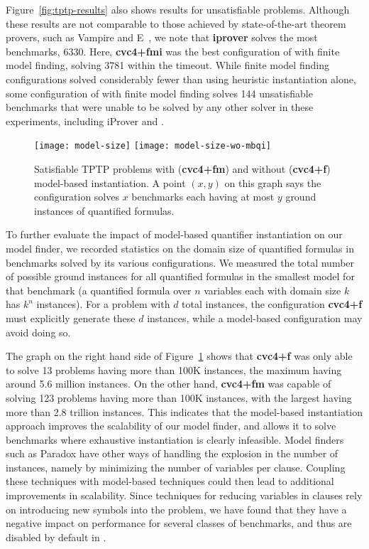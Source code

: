 \documentclass{svjour3}                     %
\begin{document}
Figure~\ref{fig:tptp-results} also shows results for unsatisfiable problems.
Although these results are not comparable to those achieved
by state-of-the-art theorem provers, such as Vampire and E~\cite{DBLP:conf/cav/KovacsV13,schulz2002brainiac}, 
we note that {\bf iprover} solves the most benchmarks, 6330.
Here, {\bf cvc4+fmi} was the best configuration of \cvc with finite model finding,
solving 3781 within the timeout.
While finite model finding configurations solved considerably fewer than using heuristic instantiation alone,
some configuration of \cvc with finite model finding solves 144 unsatisfiable benchmarks
that were unable to be solved by any other solver in these experiments,
including iProver and \ziii.

\begin{figure}[t]
\centering
\texttt{[image: model-size]}
\texttt{[image: model-size-wo-mbqi]}
\caption[Satisfiable TPTP problems with and without model-based instantiation.]{
Satisfiable TPTP problems with ({\bf cvc4+fm}) and without ({\bf cvc4+f}) model-based instantiation.
A point $(x,y)$ on this graph says the configuration solves $x$ benchmarks each having at most $y$ ground instances of quantified formulas.
}
\label{fig:tptp-model-size}
\end{figure}

To further evaluate the impact of model-based quantifier instantiation 
on our model finder, 
we recorded statistics on the domain size of quantified formulas 
in benchmarks solved by its various configurations.
We measured the total number of possible ground instances for all quantified formulas 
in the smallest model for that benchmark (a quantified formula over $n$ variables each with domain size $k$ has $k^n$ instances).
For a problem with $d$ total instances, the configuration {\bf cvc4+f} must explicitly generate these $d$ instances, 
while a model-based configuration may avoid doing so.

The graph on the right hand side of Figure~\ref{fig:tptp-model-size} shows that
{\bf cvc4+f} was only able to solve 13 problems having
more than 100K instances, the maximum having around 5.6 million instances.
On the other hand, {\bf cvc4+fm} was capable of solving 123 problems having 
more than 100K instances, 
with the largest having more than 2.8 trillion instances.
This indicates that the model-based instantiation approach improves the scalability 
of our model finder, and allows it to solve benchmarks 
where exhaustive instantiation is clearly infeasible.
Model finders such as Paradox have other ways of handling the explosion in the number of instances, 
namely by minimizing the number of variables per clause.
Coupling these techniques with model-based techniques could then lead to additional improvements in scalability.
Since techniques for reducing variables in clauses rely on introducing new symbols into the problem,
we have found that they have a negative impact on performance for several classes of benchmarks,
and thus are disabled by default in \cvc.
\end{document}
